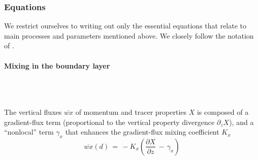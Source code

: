 
\subsubsection{Equations
\label{sec:pkg:kpp:equations}}

We restrict ourselves to writing out only the essential equations
that relate to main processes and parameters mentioned above.
We closely follow the notation of \cite{lar-eta:94}.

\paragraph{Mixing in the boundary layer} ~ \\
%
~

The vertical fluxes $\overline{wx}$
of momentum and tracer properties $X$
is composed of a gradient-flux term (proportional to
the vertical property divergence $\partial_z X$), and
a ``nonlocal'' term $\gamma_x$ that enhances the
gradient-flux mixing coefficient $K_x$
%
\begin{equation}
\overline{wx}(d) \, = \, -K_x \left(
\frac{\partial X}{\partial z} \, - \, \gamma_x \right)
\end{equation}

